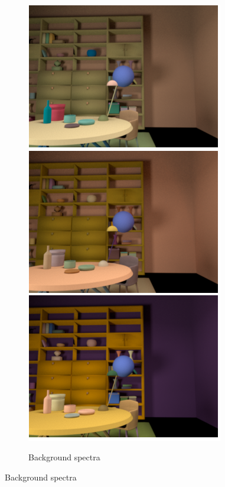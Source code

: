\documentclass{jov}
\begin{document}
\begin{figure}
\begin{subfigure}[b]{0.18 \textwidth}
        \label{fig:illuminationVariation}
    \end{subfigure}
          ~  
    \begin{subfigure}[b]{0.18 \textwidth}
    \centering
        \caption{Background spectra}
        \includegraphics[width=\textwidth]{../FiguresDraft4/Figure5/Figure5_b.png}
        \label{fig:backGroundVariation}
    \end{subfigure}


\end{figure}
\end{document}
